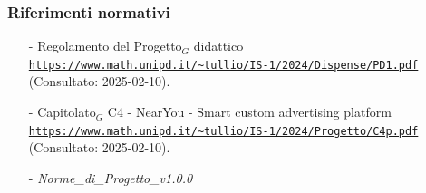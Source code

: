 \documentclass[10pt]{article}
\begin{document}
\subsubsection{Riferimenti normativi}
\begin{itemize}
    \item[-] Regolamento del Progetto$_G$ didattico  \\
    \textcolor{blue}{\texttt{\url{https://www.math.unipd.it/~tullio/IS-1/2024/Dispense/PD1.pdf}}}\\ (Consultato: 2025-02-10).
    \item[-] Capitolato$_G$ C4 - NearYou - Smart custom advertising platform\\
    \textcolor{blue}{\texttt{\url{https://www.math.unipd.it/~tullio/IS-1/2024/Progetto/C4p.pdf}}}\\ (Consultato: 2025-02-10).
    \item[-] \textit{Norme\_di\_Progetto\_v1.0.0}
\end{itemize}
\end{document}
